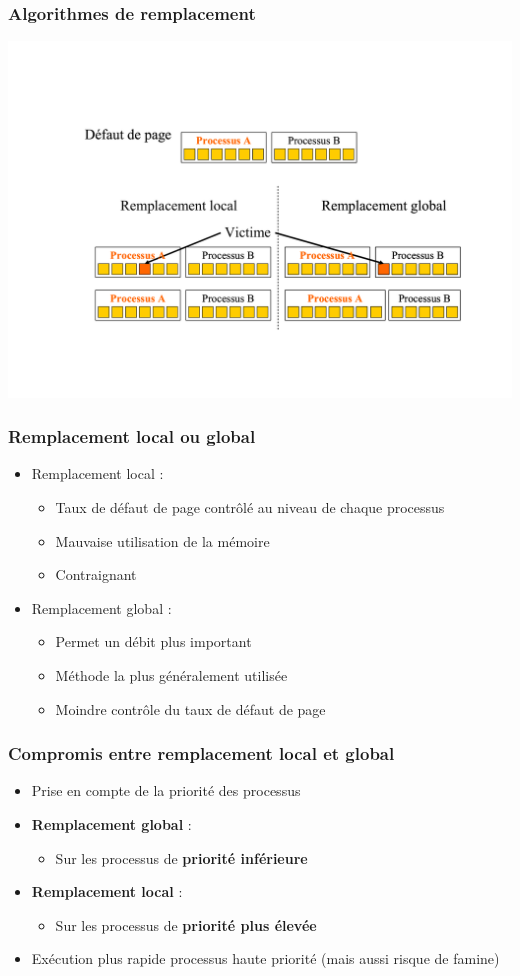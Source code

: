 \begin{frame}
\frametitle{Algorithmes de remplacement}
\includegraphics[width=.9\textwidth]{../illustration/remplacement_portee.pdf}
\end{frame}


\begin{frame}
\frametitle{Remplacement local ou global}
\begin{itemize}
\item Remplacement local :
\begin{itemize}
\item Taux de défaut de page contrôlé au niveau de chaque processus
\item Mauvaise utilisation de la mémoire
\item Contraignant
\end{itemize}
\item Remplacement global :
\begin{itemize}
\item Permet un débit plus important
\item Méthode la plus généralement utilisée
\item Moindre contrôle du taux de défaut de page
\end{itemize}
\end{itemize}
\end{frame}


\begin{frame}
\frametitle{Compromis entre remplacement local et global }
\begin{itemize}
\item Prise en compte de la priorité des processus
\item \textbf{Remplacement global} :
\begin{itemize}
\item Sur les processus de \textbf{priorité inférieure}
\end{itemize}
\item \textbf{Remplacement local} :
\begin{itemize}
\item Sur les processus de \textbf{priorité plus élevée}
\end{itemize}
\item Exécution plus rapide processus haute priorité (mais aussi risque de famine)
\end{itemize}
\end{frame}


